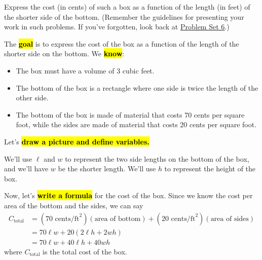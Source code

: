 \documentclass{article}
\makeatletter
\let\@href=\href
\renewcommand{\href}[2]{\@href{#1}{\ul{#2}}}
\makeatother
\begin{document}
\begin{enumerate}
\begin{enumerate}
    \begin{problem}[\nstretch{2}]
      Express the cost (in cents) of such a box as a function of the length (in feet) of the shorter side of the bottom. (Remember the guidelines for presenting your work in such problems. If you've forgotten, look back at \href{https://canvas.harvard.edu/courses/138327/files/20704944?wrap=1}{Problem Set 6}.) 
    \end{problem}

    \begin{solution}
      The \hl{\textbf{goal}} is to express the cost of the box as a function of the length of the shorter side on the bottom.
      We \hl{\textbf{know}}:
      \begin{itemize}[nosep]
        \item The box must have a volume of 3 cubic feet.
        \item The bottom of the box is a rectangle where one side is twice the length of the other side.
        \item The bottom of the box is made of material that costs 70 cents per square foot, while the sides are made of
        material that costs 20 cents per square foot.
      \end{itemize}

      Let's \hl{\textbf{draw a picture and define variables.}}
      

      We'll use $\ell$ and $w$ to represent the two side lengths on the bottom of the box, and we'll have $w$ be the shorter
      length. We'll use $h$ to represent the height of the box.

      Now, let's \hl{\textbf{write a formula}} for the cost of the box. Since we know the cost per area of the bottom and the
      sides, we can say
      \begin{align*}
      C_\text{total} &= (70\text{ cents/ft}^2)(\text{area of bottom}) + (20\text{ cents/ft}^2)(\text{area of sides}) \\
      &= 70\ell w + 20(2\ell h + 2 wh) \\
      &= 70\ell w + 40\ell h + 40 wh
      \end{align*}
      where $C_\text{total}$ is the total cost of the box.


\end{solution}
\end{enumerate}
\end{enumerate}
\end{document}
